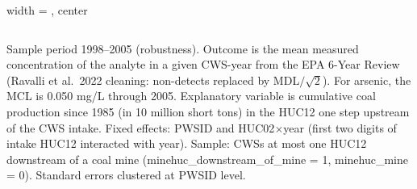 \begin{table}[htbp]
\begin{adjustbox}{width = \textwidth, center}
\begin{tabular}{lccccc}
      \end{tabular}
      
      
      
   \end{adjustbox}
      {\tiny\linespread{1}\selectfont \par \raggedright 
   Sample period 1998--2005 (robustness). Outcome is the mean measured concentration of the analyte in a given CWS-year from the EPA 6-Year Review (Ravalli et al.~2022 cleaning: non-detects replaced by MDL$/\sqrt{2}$). For arsenic, the MCL is 0.050 mg/L through 2005. Explanatory variable is cumulative coal production since 1985 (in 10 million short tons) in the HUC12 one step upstream of the CWS intake. Fixed effects: PWSID and HUC02$\times$year (first two digits of intake HUC12 interacted with year). Sample: CWSs at most one HUC12 downstream of a coal mine (minehuc\_downstream\_of\_mine = 1, minehuc\_mine = 0). Standard errors clustered at PWSID level.}
   
\end{table}


